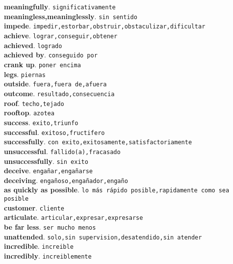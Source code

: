 \documentclass[twocolumn]{article}
\begin{document}
	\textsf{\textbf{meaningfully}}. \texttt{significativamente}\\
	\textsf{\textbf{meaningless,meaninglessly}}. \texttt{sin sentido}\\
	\textsf{\textbf{impede}}. \texttt{impedir,estorbar,obstruir,obstaculizar,dificultar}\\
	\textsf{\textbf{achieve}}. \texttt{lograr,conseguir,obtener}\\
	\textsf{\textbf{achieved}}. \texttt{logrado}\\
	\textsf{\textbf{achieved by}}. \texttt{conseguido por}\\
	\textsf{\textbf{crank up}}. \texttt{poner encima}\\
	\textsf{\textbf{legs}}. \texttt{piernas}\\
	\textsf{\textbf{outside}}. \texttt{fuera,fuera de,afuera}\\
	\textsf{\textbf{outcome}}. \texttt{resultado,consecuencia}\\
	\textsf{\textbf{roof}}. \texttt{techo,tejado}\\
	\textsf{\textbf{rooftop}}. \texttt{azotea}\\
	\textsf{\textbf{success}}. \texttt{exito,triunfo}\\
	\textsf{\textbf{successful}}. \texttt{exitoso,fructifero}\\
	\textsf{\textbf{successfully}}. \texttt{con exito,exitosamente,satisfactoriamente}\\
    \textsf{\textbf{unsuccessful}}. \texttt{fallido(a),fracasado}\\
	\textsf{\textbf{unsuccessfully}}. \texttt{sin exito}\\
	\textsf{\textbf{deceive}}. \texttt{enga\~nar,enga\~narse}\\
	\textsf{\textbf{deceiving}}. \texttt{enga\~noso,enga\~nador,enga\~no}\\
	\textsf{\textbf{as quickly as possible}}. \texttt{lo m\'as r\'apido posible,rapidamente como sea posible}\\
	\textsf{\textbf{customer}}. \texttt{cliente}\\
	\textsf{\textbf{articulate}}. \texttt{articular,expresar,expresarse}\\
	\textsf{\textbf{be far less}}. \texttt{ser mucho menos}\\
	\textsf{\textbf{unattended}}. \texttt{solo,sin supervision,desatendido,sin atender}\\
	\textsf{\textbf{incredible}}. \texttt{increible}\\
	\textsf{\textbf{incredibly}}. \texttt{increiblemente}\\
\end{document}
